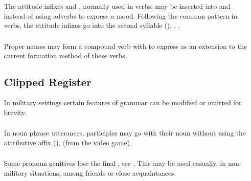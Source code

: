 \subsubsection{}The attitude infixes  and ,
normally used in verbs, may be inserted into  
and   instead of using adverbs to express a mood.
Following the common pattern in verbs, the attitude infixes go into
the second syllable (),
, . 

\subsubsection{}Proper names may form a compound verb with  to
express  as an extension to the current formation method of
these verbs.


\subsection{Clipped Register} In military settings certain features of
grammar can be modified or omitted for brevity.

\subsubsection{} In noun phrase utterances, participles may go with
their noun without using the attri\-bu\-tive affix 
(),   (from
the video game).

\subsubsection{} Some pronoun genitives lose the final , see
.  This may be used casually, in
non-military situations, among friends or close acquaintances.

